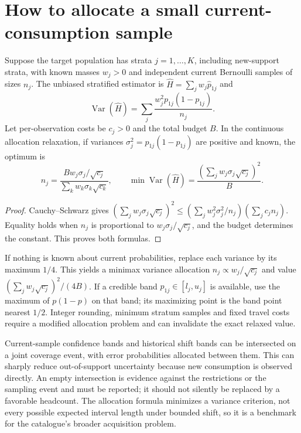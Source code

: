 \documentclass[11pt,a4paper]{article}
\DeclareMathOperator{\Var}{Var}
\begin{document}
\section{How to allocate a small current-consumption sample}
Suppose the target population has strata $j=1,\ldots,K$, including new-support strata, with known masses $w_j>0$ and independent current Bernoulli samples of sizes $n_j$. The unbiased stratified estimator is $\widehat H=\sum_jw_j\widehat p_{1j}$ and
\[
 \Var(\widehat H)=\sum_j\frac{w_j^2p_{1j}(1-p_{1j})}{n_j}.
\]
Let per-observation costs be $c_j>0$ and the total budget $B$. In the continuous allocation relaxation, if variances $\sigma_j^2=p_{1j}(1-p_{1j})$ are positive and known, the optimum is
\[
 n_j=\frac{B w_j\sigma_j/\sqrt{c_j}}
            {\sum_k w_k\sigma_k\sqrt{c_k}},\qquad
 \min\Var(\widehat H)=\frac{(\sum_jw_j\sigma_j\sqrt{c_j})^2}{B}.
\tag{3}
\]
\begin{proof}
Cauchy--Schwarz gives
$(\sum_jw_j\sigma_j\sqrt{c_j})^2
\le(\sum_jw_j^2\sigma_j^2/n_j)(\sum_jc_jn_j)$.
Equality holds when $n_j$ is proportional to $w_j\sigma_j/\sqrt{c_j}$, and the budget determines the constant. This proves both formulas.
\end{proof}
If nothing is known about current probabilities, replace each variance by its maximum $1/4$. This yields a minimax variance allocation $n_j\propto w_j/\sqrt{c_j}$ and value $(\sum_jw_j\sqrt{c_j})^2/(4B)$. If a credible band $p_{1j}\in[l_j,u_j]$ is available, use the maximum of $p(1-p)$ on that band; its maximizing point is the band point nearest $1/2$. Integer rounding, minimum stratum samples and fixed travel costs require a modified allocation problem and can invalidate the exact relaxed value.

Current-sample confidence bands and historical shift bands can be intersected on a joint coverage event, with error probabilities allocated between them. This can sharply reduce out-of-support uncertainty because new consumption is observed directly. An empty intersection is evidence against the restrictions or the sampling event and must be reported; it should not silently be replaced by a favorable headcount. The allocation formula minimizes a variance criterion, not every possible expected interval length under bounded shift, so it is a benchmark for the catalogue's broader acquisition problem.
\end{document}
